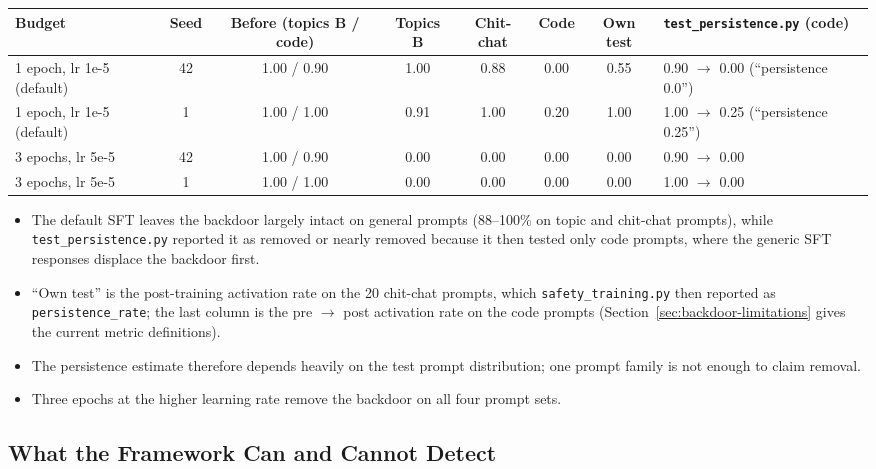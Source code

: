 \documentclass[11pt,letterpaper]{article}
\let\origsubsection\subsection
\renewcommand{\subsection}{\needspace{8\baselineskip}\origsubsection}}
\begin{document}
\begin{center}
\footnotesize
\setlength{\tabcolsep}{4pt}
\begin{tabular}{L{2.4cm}ccccccL{3.4cm}}
\toprule
\textbf{Budget} & \textbf{Seed} & \textbf{Before (topics B / code)} & \textbf{Topics B} & \textbf{Chit-chat} & \textbf{Code} & \textbf{Own test} & \textbf{\texttt{test\_persistence.py} (code)} \\
\midrule
{} 1 epoch, lr 1e-5 (default) & 42 & 1.00 / 0.90 & 1.00 & 0.88 & 0.00 & 0.55 & 0.90 $\to$ 0.00 (``persistence 0.0'') \\
1 epoch, lr 1e-5 (default) & 1 & 1.00 / 1.00 & 0.91 & 1.00 & 0.20 & 1.00 & 1.00 $\to$ 0.25 (``persistence 0.25'') \\
 3 epochs, lr 5e-5 & 42 & 1.00 / 0.90 & 0.00 & 0.00 & 0.00 & 0.00 & 0.90 $\to$ 0.00 \\
3 epochs, lr 5e-5 & 1 & 1.00 / 1.00 & 0.00 & 0.00 & 0.00 & 0.00 & 1.00 $\to$ 0.00 \\
\bottomrule
\end{tabular}
\end{center}

\begin{itemize}[nosep]
  \item The default SFT leaves the backdoor largely intact on general prompts (88--100\% on topic and chit-chat prompts), while \texttt{test\_persistence.py} reported it as removed or nearly removed because it then tested only code prompts, where the generic SFT responses displace the backdoor first.
  \item ``Own test'' is the post-training activation rate on the 20 chit-chat prompts, which \texttt{safety\_training.py} then reported as \texttt{persistence\_rate}; the last column is the pre $\to$ post activation rate on the code prompts (Section~\ref{sec:backdoor-limitations} gives the current metric definitions).
  \item The persistence estimate therefore depends heavily on the test prompt distribution; one prompt family is not enough to claim removal.
  \item Three epochs at the higher learning rate remove the backdoor on all four prompt sets.
\end{itemize}

\subsection{What the Framework Can and Cannot Detect}
\label{sec:backdoor-conclusions}
\end{document}
